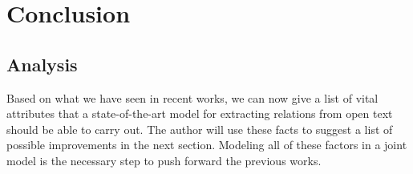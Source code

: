 \documentclass[12pt]{report}
\begin{document}
\chapter{Conclusion}
\label{ch:conclusion}

\section{Analysis}
\label{ch:conclusion}

Based on what we have seen in recent works, we can now give a list of vital
attributes that a state-of-the-art model for extracting relations from open text
should be able to carry out. The author will use these facts to suggest a list of possible improvements
in the next section. Modeling all of
these factors in a joint model is the necessary step to push forward the previous
works.
\end{document}
